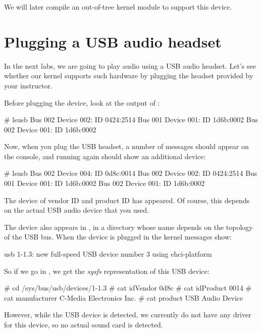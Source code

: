 {We will later compile an out-of-tree kernel module to support this device.

\section{Plugging a USB audio headset}

In the next labs, we are going to play audio using a USB audio headset.
Let's see whether our kernel supports such hardware by plugging the
headset provided by your instructor.

Before plugging the device, look at the output of :

\begin{bashinput}
# lsusb
Bus 002 Device 002: ID 0424:2514
Bus 001 Device 001: ID 1d6b:0002
Bus 002 Device 001: ID 1d6b:0002
\end{bashinput}

Now, when you plug the USB headset, a number of messages should appear
on the console, and running  again should show an
additional device:

\begin{bashinput}
# lsusb
Bus 002 Device 004: ID 0d8c:0014
Bus 002 Device 002: ID 0424:2514
Bus 001 Device 001: ID 1d6b:0002
Bus 002 Device 001: ID 1d6b:0002
\end{bashinput}

The device of vendor ID  and product ID  has
appeared. Of course, this depends on the actual USB audio device
that you used.

The device also appears in , in a
directory whose name depends on the topology of the USB bus. When the
device is plugged in the kernel messages show:

\begin{bashinput}
usb 1-1.3: new full-speed USB device number 3 using ehci-platform
\end{bashinput}

So if we go in , we get the {\em
sysfs} representation of this USB device:

\begin{bashinput}
# cd /sys/bus/usb/devices/1-1.3
# cat idVendor
0d8c
# cat idProduct
0014
# cat manufacturer
C-Media Electronics Inc.
# cat product
USB Audio Device
\end{bashinput}

However, while the USB device is detected, we currently do not have
any driver for this device, so no actual sound card is detected.

}

